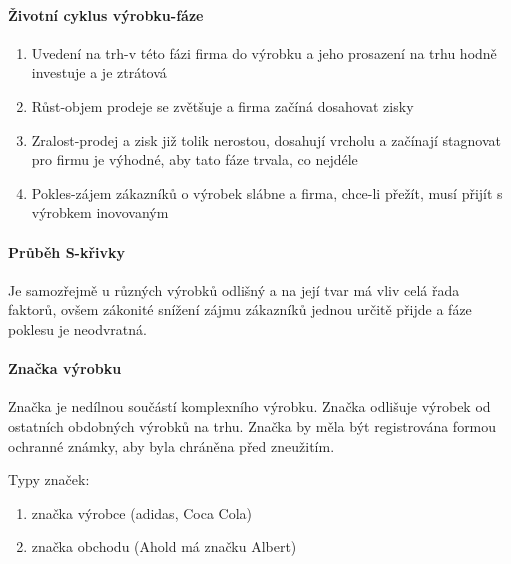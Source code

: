 \paragraph*{Životní cyklus výrobku-fáze}
\begin{enumerate}
    \item Uvedení na trh-v této fázi firma do výrobku a jeho prosazení na trhu hodně investuje a je ztrátová
    \item Růst-objem prodeje se zvětšuje a firma začíná dosahovat zisky
    \item Zralost-prodej a zisk již tolik nerostou, dosahují vrcholu a začínají stagnovat pro firmu je výhodné, aby tato fáze trvala, co nejdéle
    \item Pokles-zájem zákazníků o výrobek slábne a firma, chce-li přežít, musí přijít s výrobkem inovovaným
\end{enumerate}

\paragraph*{Průběh S-křivky}
Je samozřejmě u různých výrobků odlišný a na její tvar má vliv celá řada faktorů, ovšem zákonité snížení zájmu zákazníků jednou určitě přijde a fáze poklesu je neodvratná.

\paragraph*{Značka výrobku}
Značka je nedílnou součástí komplexního výrobku. Značka odlišuje výrobek od ostatních obdobných výrobků na trhu. Značka by měla být registrována formou ochranné známky, aby byla chráněna před zneužitím.

Typy značek:
\begin{enumerate}
    \item značka výrobce (adidas, Coca Cola)
    \item značka obchodu (Ahold má značku Albert)
\end{enumerate}

